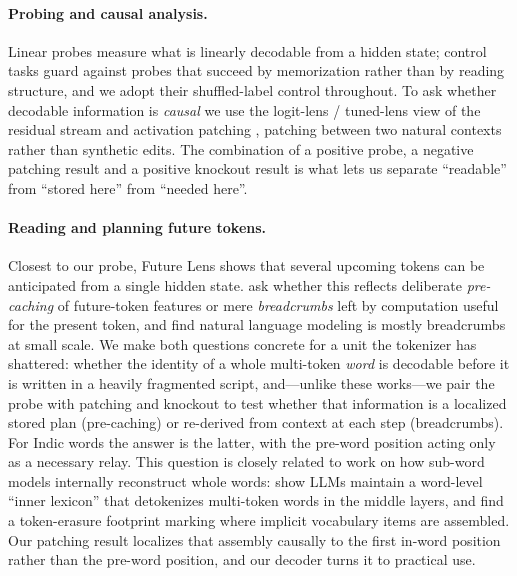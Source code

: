 \paragraph{Probing and causal analysis.} Linear probes
\citep{alain2017probes} measure what is linearly decodable from a hidden
state; control tasks \citep{hewitt2019control} guard against probes that
succeed by memorization rather than by reading structure, and we adopt their
shuffled-label control throughout. To ask whether decodable information is
\emph{causal} we use the logit-lens / tuned-lens view of the residual stream
\citep{belrose2023tunedlens,elhage2021framework} and activation patching
\citep{meng2022rome,wang2023ioi,goldowskydill2023pathpatching}, patching
between two natural contexts rather than synthetic edits. The combination of a
positive probe, a negative patching result and a positive knockout result is
what lets us separate ``readable'' from ``stored here'' from ``needed here''.

\paragraph{Reading and planning future tokens.} Closest to our probe, Future
Lens \citep{pal2023futurelens} shows that several upcoming tokens can be
anticipated from a single hidden state. \citet{wu2024planahead} ask whether
this reflects deliberate \emph{pre-caching} of future-token features or mere
\emph{breadcrumbs} left by computation useful for the present token, and find
natural language modeling is mostly breadcrumbs at small scale. We make both
questions concrete for a unit the tokenizer has shattered: whether the identity
of a whole multi-token \emph{word} is decodable before it is written in a
heavily fragmented script, and---unlike these works---we pair the probe with
patching and knockout to test whether that information is a localized stored
plan (pre-caching) or re-derived from context at each step (breadcrumbs). For
Indic words the answer is the latter, with the pre-word position acting only as
a necessary relay. This question is closely related to work on how sub-word
models internally reconstruct whole words: \citet{kaplan2025tokens} show LLMs
maintain a word-level ``inner lexicon'' that detokenizes multi-token words in
the middle layers, and \citet{feucht2024erasure} find a token-erasure footprint
marking where implicit vocabulary items are assembled. Our patching result
localizes that assembly causally to the first in-word position rather than the
pre-word position, and our decoder turns it to practical use.

